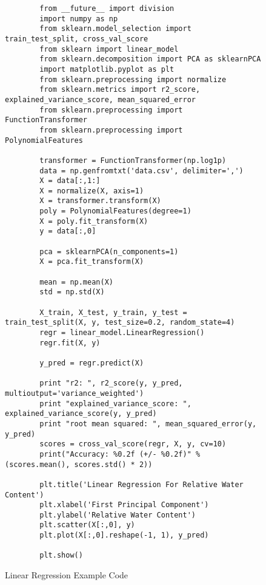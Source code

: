 \begin{figure}
    \begin{lstlisting}
        from __future__ import division
        import numpy as np
        from sklearn.model_selection import train_test_split, cross_val_score
        from sklearn import linear_model
        from sklearn.decomposition import PCA as sklearnPCA
        import matplotlib.pyplot as plt
        from sklearn.preprocessing import normalize
        from sklearn.metrics import r2_score, explained_variance_score, mean_squared_error
        from sklearn.preprocessing import FunctionTransformer
        from sklearn.preprocessing import PolynomialFeatures

        transformer = FunctionTransformer(np.log1p)
        data = np.genfromtxt('data.csv', delimiter=',')
        X = data[:,1:]
        X = normalize(X, axis=1)
        X = transformer.transform(X)
        poly = PolynomialFeatures(degree=1)
        X = poly.fit_transform(X)
        y = data[:,0]

        pca = sklearnPCA(n_components=1)
        X = pca.fit_transform(X)

        mean = np.mean(X)
        std = np.std(X)

        X_train, X_test, y_train, y_test = train_test_split(X, y, test_size=0.2, random_state=4)
        regr = linear_model.LinearRegression()
        regr.fit(X, y)

        y_pred = regr.predict(X)

        print "r2: ", r2_score(y, y_pred, multioutput='variance_weighted')
        print "explained_variance_score: ", explained_variance_score(y, y_pred)
        print "root mean squared: ", mean_squared_error(y, y_pred)
        scores = cross_val_score(regr, X, y, cv=10)
        print("Accuracy: %0.2f (+/- %0.2f)" % (scores.mean(), scores.std() * 2))

        plt.title('Linear Regression For Relative Water Content')
        plt.xlabel('First Principal Component')
        plt.ylabel('Relative Water Content')
        plt.scatter(X[:,0], y)
        plt.plot(X[:,0].reshape(-1, 1), y_pred)

        plt.show()
    \end{lstlisting}
    \caption{Linear Regression Example Code}
    \label{fig:scattering}
\end{figure}
